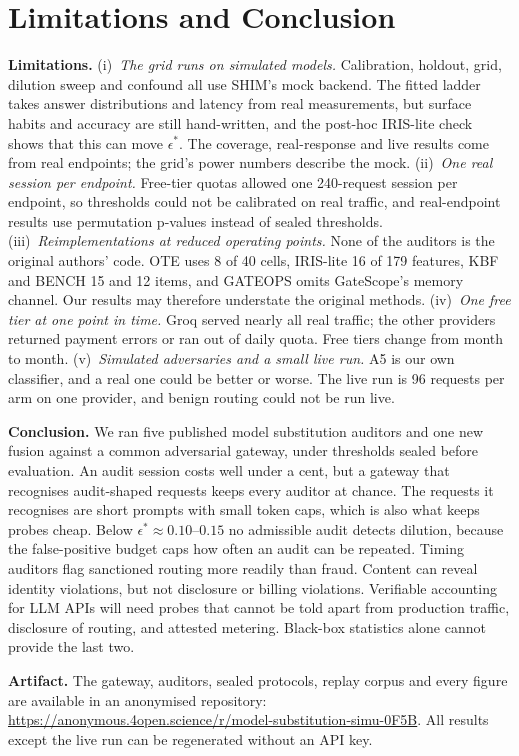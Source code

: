 \section{Limitations and Conclusion}\label{sec:conclusion}
\textbf{Limitations.} (i)~\emph{The grid runs on simulated models.} Calibration, holdout, grid,
dilution sweep and confound all use SHIM's mock backend. The fitted ladder takes answer
distributions and latency from real measurements, but surface habits and accuracy are still
hand-written, and the post-hoc IRIS-lite check shows that this can move $\epsilon^*$. The coverage,
real-response and live results come from real endpoints; the grid's power numbers describe the
mock. (ii)~\emph{One real session per endpoint.} Free-tier quotas allowed one 240-request session
per endpoint, so thresholds could not be calibrated on real traffic, and real-endpoint results use
permutation p-values instead of sealed thresholds. (iii)~\emph{Reimplementations at reduced
operating points.} None of the auditors is the original authors' code. OTE uses 8 of 40 cells,
IRIS-lite 16 of 179 features, KBF and BENCH 15 and 12 items, and GATEOPS omits GateScope's memory
channel. Our results may therefore understate the original methods. (iv)~\emph{One free tier at one
point in time.} Groq served nearly all real traffic; the other providers returned payment errors or
ran out of daily quota. Free tiers change from month to month. (v)~\emph{Simulated adversaries and a
small live run.} A5 is our own classifier, and a real one could be better or worse. The live run is
96 requests per arm on one provider, and benign routing could not be run live.

\textbf{Conclusion.} We ran five published model substitution auditors and one new fusion against a
common adversarial gateway, under thresholds sealed before evaluation. An audit session costs
well under a cent, but a gateway that recognises audit-shaped
requests keeps every auditor at chance. The requests it recognises are short prompts with small
token caps, which is also what keeps probes cheap. Below $\epsilon^* \approx 0.10$--$0.15$ no admissible audit detects dilution, because the false-positive
budget caps how often an audit can be repeated. Timing auditors flag
sanctioned routing more readily than fraud. Content can reveal identity violations, but not
disclosure or billing violations. Verifiable accounting for LLM
APIs will need probes that cannot be told apart from production traffic, disclosure of routing, and
attested metering. Black-box statistics alone cannot provide the last two.

\textbf{Artifact.} The gateway, auditors, sealed protocols, replay corpus and every figure are
available in an anonymised repository:
\url{https://anonymous.4open.science/r/model-substitution-simu-0F5B}. All results except the live
run can be regenerated without an API key.
